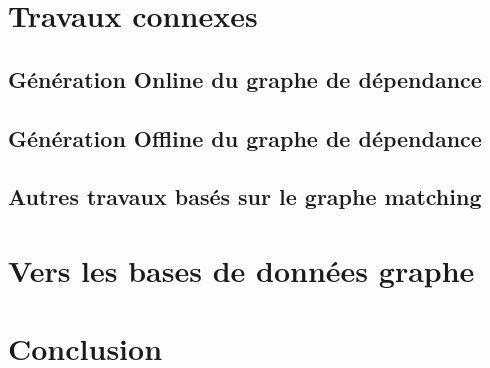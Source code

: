 


\section{Travaux connexes}
\label{sec:travaux-relatives}


  \subsection{Génération Online du graphe de dépendance}
  \label{sec:generation-online-du}

  \subsection{Génération Offline du graphe de dépendance}
  \label{sec:gener-offl-du}

  \subsection{Autres travaux basés sur le graphe matching}
  \label{sec:autres-travaux}

\section{Vers les bases de données graphe}
\label{sec:vers-les-bases}

\section{Conclusion}
\label{sec:conclusion-2}


